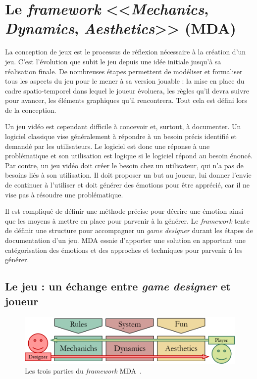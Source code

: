 \chapter{Le \emph{framework} <<\emph{Mechanics}, \emph{Dynamics}, \emph{Aesthetics}>> (MDA)}
\label{chap.MDA}


La conception de jeux est le processus de réflexion nécessaire à la création d'un jeu.
C'est l'évolution que subit le jeu depuis une idée initiale jusqu'à sa réalisation finale.
De nombreuses étapes permettent de modéliser et formaliser tous les aspects du jeu pour le mener à sa version jouable : 
la mise en place du cadre spatio-temporel dans lequel le joueur évoluera, les règles qu'il devra suivre pour avancer, les éléments graphiques qu'il rencontrera. Tout cela est défini lors de la conception. 

Un jeu vidéo est cependant difficile à concevoir et, surtout, à documenter.
Un logiciel classique vise généralement \`a répondre à un besoin précis identifié et demandé par les utilisateurs.
Le logiciel est donc une réponse à une problématique et son utilisation est logique si le logiciel répond au besoin énoncé.
%
Par contre, un jeu vidéo doit créer le besoin chez un utilisateur, qui n'a pas de besoins liés à son utilisation.
Il doit proposer un but au joueur, lui donner l'envie de continuer à l'utiliser et doit générer des émotions pour être apprécié, car il ne vise pas \`a r\'esoudre une problématique.

Il est compliqué de définir une méthode précise pour décrire une émotion ainsi que les moyens à mettre en place pour parvenir à la générer.
Le \emph{framework}  tente de définir une structure pour accompagner un \emph{game designer} durant les étapes de documentation d'un jeu.
MDA essaie d'apporter une solution en apportant une catégorisation des émotions et des approches et techniques pour parvenir à les générer.


\section{Le jeu : un échange entre \emph{game designer} et joueur}




\begin{figure}
    \begin{center}
    \includegraphics[width=14cm]{10_img/chap3/mda.png} 
    \caption{Les trois parties du \emph{framework} MDA~\cite{MDA_formal}.}
    \label{fig:mda}
    \end{center}
\end{figure}

